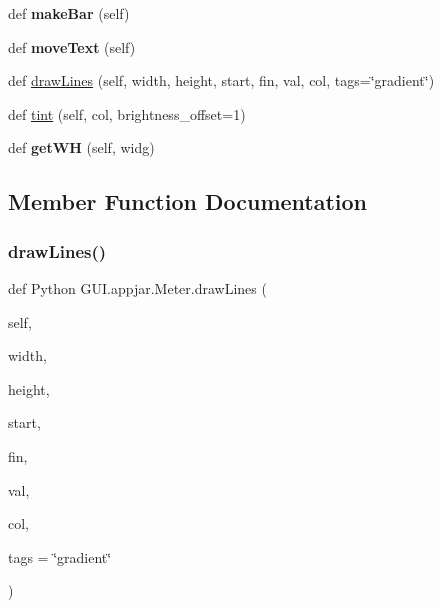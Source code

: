 \begin{DoxyCompactItemize}
def {\bfseries make\+Bar} (self)
\item 
\mbox{\label{class_python_01_g_u_i_1_1appjar_1_1_meter_a0b57b3ab0e5402cc53beb7eb5f16d23b}} 
def {\bfseries move\+Text} (self)
\item 
def \hyperlink{class_python_01_g_u_i_1_1appjar_1_1_meter_ac06e7667e6f7036da45382ffe289508f}{draw\+Lines} (self, width, height, start, fin, val, col, tags=\char`\"{}gradient\char`\"{})
\item 
def \hyperlink{class_python_01_g_u_i_1_1appjar_1_1_meter_a2a18129529a84f7d36a27bee02792ec3}{tint} (self, col, brightness\+\_\+offset=1)
\item 
\mbox{\label{class_python_01_g_u_i_1_1appjar_1_1_meter_abbbad84c88adf52e2996af2fcdaffc58}} 
def {\bfseries get\+WH} (self, widg)
\end{DoxyCompactItemize}


\subsection{Member Function Documentation}
\mbox{\label{class_python_01_g_u_i_1_1appjar_1_1_meter_ac06e7667e6f7036da45382ffe289508f}} 
\subsubsection{\texorpdfstring{draw\+Lines()}{drawLines()}}
{\footnotesize\ttfamily def Python G\+U\+I.\+appjar.\+Meter.\+draw\+Lines (\begin{DoxyParamCaption}\item[{}]{self,  }\item[{}]{width,  }\item[{}]{height,  }\item[{}]{start,  }\item[{}]{fin,  }\item[{}]{val,  }\item[{}]{col,  }\item[{}]{tags = {\ttfamily \char`\"{}gradient\char`\"{}} }\end{DoxyParamCaption})}

